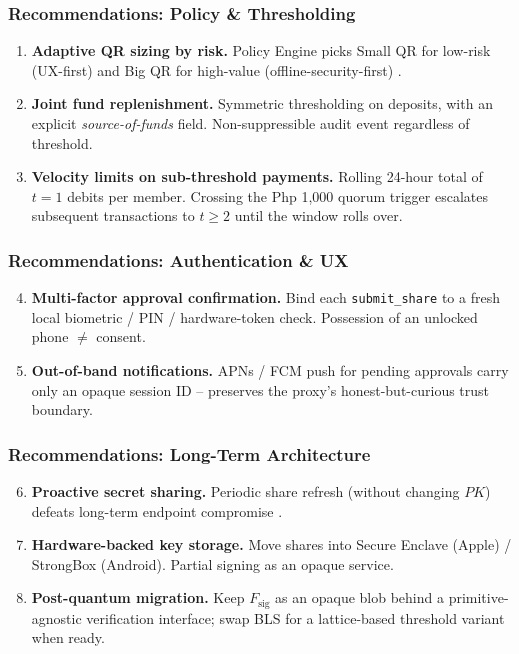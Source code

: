 \documentclass{beamer}
\newcommand{\HL}[1]{\textcolor{emphasis}{#1}}
\begin{document}
\begin{frame}
  \frametitle{Recommendations: Policy \& Thresholding}
  \begin{enumerate}
      \item \textbf{Adaptive QR sizing by risk.} Policy Engine picks Small QR for low-risk (UX-first) and Big QR for high-value (offline-security-first) \cite{corpuz2025, reed1960, bajaj2024}.
      \item \textbf{Joint fund replenishment.} Symmetric thresholding on deposits, with an explicit \textit{source-of-funds} field. Non-suppressible audit event regardless of threshold.
      \item \textbf{Velocity limits on sub-threshold payments.} Rolling 24-hour total of $t{=}1$ debits per member. Crossing the Php 1{,}000 quorum trigger \HL{escalates} subsequent transactions to $t \ge 2$ until the window rolls over.
  \end{enumerate}
\end{frame}

\begin{frame}
  \frametitle{Recommendations: Authentication \& UX}
  \begin{enumerate}
      \setcounter{enumi}{3}
      \item \textbf{Multi-factor approval confirmation.} Bind each \texttt{submit\_share} to a fresh \HL{local biometric / PIN / hardware-token} check. Possession of an unlocked phone $\neq$ consent.
      \item \textbf{Out-of-band notifications.} APNs / FCM push for pending approvals carry only an opaque session ID -- preserves the proxy's honest-but-curious trust boundary.
  \end{enumerate}
\end{frame}

\begin{frame}
  \frametitle{Recommendations: Long-Term Architecture}
  \begin{enumerate}
      \setcounter{enumi}{5}
      \item \textbf{Proactive secret sharing.} Periodic share refresh (without changing $PK$) defeats long-term endpoint compromise \cite{shamir1979, gennaro2007, komlo2021}.
      \item \textbf{Hardware-backed key storage.} Move shares into Secure Enclave (Apple) / StrongBox (Android). Partial signing as an opaque service.
      \item \textbf{Post-quantum migration.} Keep $F_{\text{sig}}$ as an opaque blob behind a primitive-agnostic verification interface; swap BLS for a lattice-based threshold variant when ready.
  \end{enumerate}
\end{frame}
\end{document}
